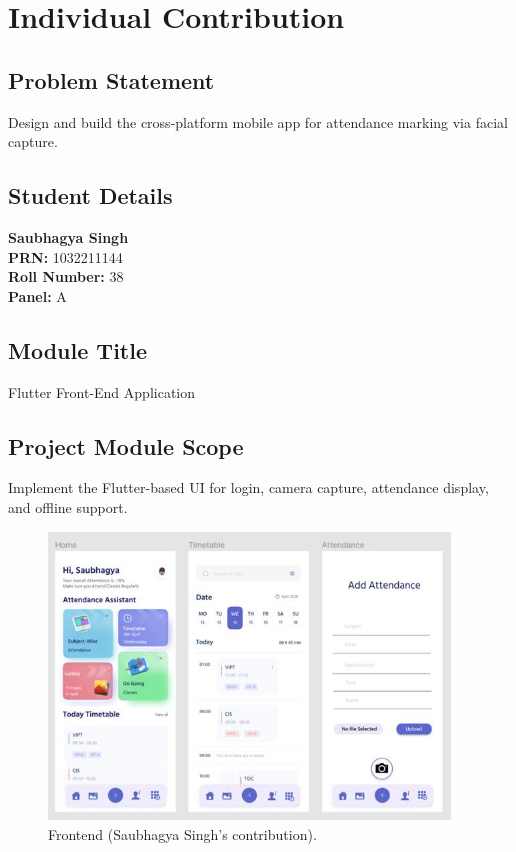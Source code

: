 \documentclass[openany]{report}
\begin{document}
\chapter{Individual Contribution}
\section{Problem Statement}
Design and build the cross-platform mobile app for attendance marking via facial capture.

\section{Student Details}
\textbf{Saubhagya Singh} \\
\textbf{PRN:} 1032211144 \\
\textbf{Roll Number:} 38 \\
\textbf{Panel:} A \\

\section{Module Title}
Flutter Front-End Application


\section{Project Module Scope}
Implement the Flutter-based UI for login, camera capture, attendance display, and offline support.
\begin{figure}[H]
    \centering
    \includegraphics[width=0.95\textwidth]{../imgs/frontend.jpg}
    \caption{Frontend  (Saubhagya Singh’s contribution).}
    \label{fig:block_diagram_saubhagya}
\end{figure}
\end{document}
